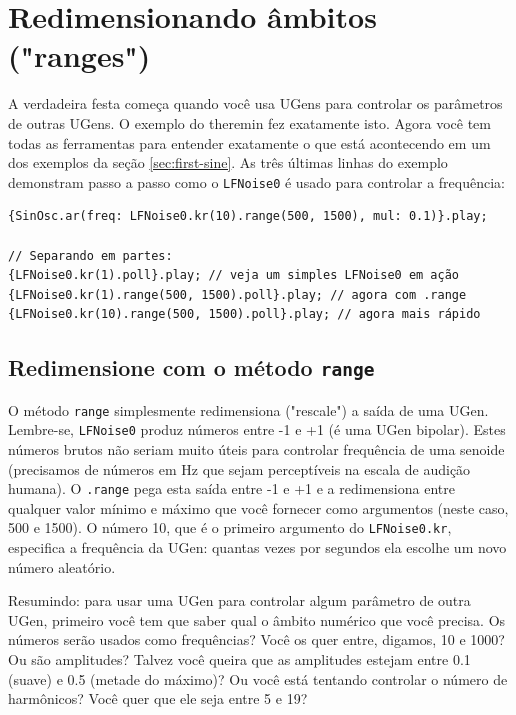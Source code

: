 \section{Redimensionando âmbitos ("ranges")}

A verdadeira festa começa quando você usa UGens para controlar os parâmetros de outras UGens. O exemplo do theremin fez exatamente isto. Agora você tem todas as ferramentas para entender exatamente o que está acontecendo em um dos exemplos da seção \ref{sec:first-sine}. As três últimas linhas do exemplo demonstram passo a passo como o \texttt{LFNoise0} é usado para controlar a frequência:

\begin{lstlisting}[style=SuperCollider-IDE, basicstyle=\scttfamily\footnotesize]
{SinOsc.ar(freq: LFNoise0.kr(10).range(500, 1500), mul: 0.1)}.play;

// Separando em partes:
{LFNoise0.kr(1).poll}.play; // veja um simples LFNoise0 em ação
{LFNoise0.kr(1).range(500, 1500).poll}.play; // agora com .range
{LFNoise0.kr(10).range(500, 1500).poll}.play; // agora mais rápido
\end{lstlisting}

\subsection{Redimensione com o método \texttt{range}}
O método  \texttt{range} simplesmente redimensiona ("rescale") a saída de uma UGen. Lembre-se, \texttt{LFNoise0} produz números entre -1 e +1 (é uma UGen bipolar). Estes números brutos não seriam muito úteis para controlar frequência de uma senoide (precisamos de números em Hz que sejam perceptíveis na escala de audição humana). O \texttt{.range} pega esta saída entre -1 e +1 e a redimensiona entre qualquer valor mínimo e máximo que você fornecer como argumentos (neste caso, 500 e 1500). O número 10, que é o primeiro argumento do \texttt{LFNoise0.kr}, especifica a frequência da UGen: quantas vezes por segundos ela escolhe um novo número aleatório.

Resumindo: para usar uma UGen para controlar algum parâmetro de outra UGen, primeiro você tem que saber qual o âmbito numérico que você precisa. Os números serão usados como frequências? Você os quer entre, digamos, 10 e 1000? Ou são amplitudes? Talvez você queira que as amplitudes estejam entre 0.1 (suave) e 0.5 (metade do máximo)? Ou você está tentando controlar o número de harmônicos? Você quer que ele seja entre 5 e 19?

